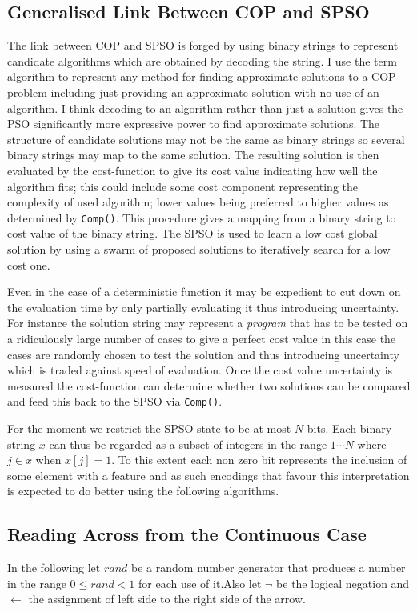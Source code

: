 \documentclass[a4paper,oneside,english]{article}
\numberwithin{equation}{section}
\numberwithin{figure}{section}
\begin{document}
\subsection{Generalised Link Between COP and SPSO}
The link between COP and SPSO is forged by using binary strings to represent candidate algorithms which are obtained by decoding the string. I use the term algorithm to represent any method for finding approximate solutions to a COP problem including just providing an approximate solution with no use of an algorithm. I think decoding to an algorithm rather than just a solution gives the PSO significantly more expressive power to find approximate solutions. The structure of candidate solutions may not be the same as binary strings  so several binary strings may map to the same solution. The resulting solution is then evaluated by the cost-function to give its cost value indicating how well the algorithm fits; this could include some cost component representing the complexity of used algorithm; lower values being preferred to higher values as determined by \texttt{Comp()}. This procedure gives a mapping from a binary string to  cost  value of the binary string. The SPSO is used to learn a low cost global solution by using a swarm of proposed solutions to iteratively search for a low cost one.


Even in the case of a deterministic  function it may be expedient to cut down on the evaluation time by only partially evaluating it thus introducing uncertainty. For instance the solution string may represent a \emph{program} that has to be tested on a ridiculously large number of cases to give a perfect cost value in this case the cases are randomly chosen to test the solution and thus introducing uncertainty which is traded against speed of evaluation. Once the cost value uncertainty is measured the cost-function can determine whether two solutions can be compared and feed this back to the SPSO via \texttt{Comp()}.  

For the moment we restrict the SPSO state to be at most $N$ bits. Each binary string $x$ can thus be regarded as a subset of integers in the range $1 \cdots N$  where $j \in x$ when $x[j] = 1$. To this extent each non zero bit represents the inclusion of some element with a feature and as such encodings that favour this interpretation is expected to do better using the following algorithms. 

\subsection{Reading Across from the Continuous Case}
In the following let $rand$ be a random number generator that produces a number in the range $0\leq rand < 1$ for each use of it.Also let $\neg$ be the logical negation and $\leftarrow$ the assignment of left side to the right side of the arrow.
\end{document}
